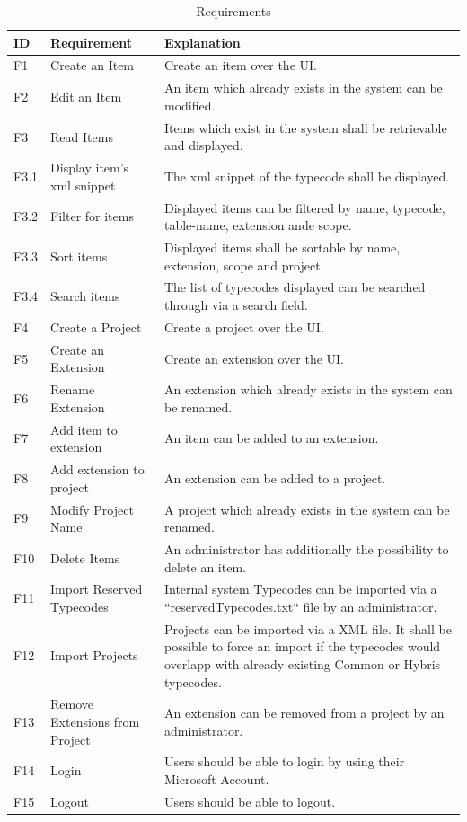 \begin{table}[H]
\centering
\begin{tabular}{|l|p{}|p{}|}
\hline
\textbf{ID} & \textbf{Requirement} & \textbf{Explanation} \\ \hline
F1 & Create an Item & Create an item over the UI.  \\ \hline
F2 & Edit an Item & An item which already exists in the system can be modified. \\ \hline
F3 & Read Items & Items which exist in the system shall be retrievable and displayed. \\ \hline
F3.1 & Display item's xml snippet & The xml snippet of the typecode shall be displayed.  \\ \hline
F3.2 & Filter for items & Displayed items can be filtered by name, typecode, table-name, extension ande scope.  \\ \hline
F3.3 & Sort items & Displayed items shall be sortable by name, extension, scope and project. \\ \hline
F3.4 & Search items & The list of typecodes displayed can be searched through via a search field. \\ \hline
F4 & Create a Project & Create a project over the UI. \\ \hline
F5 & Create an Extension & Create an extension over the UI. \\ \hline
F6 & Rename Extension & An extension which already exists in the system can be renamed. \\ \hline
F7 & Add item to extension & An item can be added to an extension. \\ \hline
F8 & Add extension to project & An extension can be added to a project. \\ \hline
F9 & Modify Project Name & A project which already exists in the system can be renamed. \\ \hline
F10 & Delete Items & An administrator has additionally the possibility to delete an item. \\ \hline
F11 & Import Reserved Typecodes & Internal system Typecodes can be imported via a ``reservedTypecodes.txt`` file by an administrator. \\ \hline
F12 & Import Projects & Projects can be imported via a XML file.
It shall be possible to force an import if the typecodes would overlapp with already existing Common or Hybris typecodes. \\ \hline
F13 & Remove Extensions from Project & An extension can be removed from a project by an administrator. \\ \hline
F14 & Login & Users should be able to login by using their Microsoft Account. \\ \hline
F15 & Logout & Users should be able to logout. \\ \hline
\end{tabular}
\caption{Requirements}
\label{tab:requirements}
\end{table}